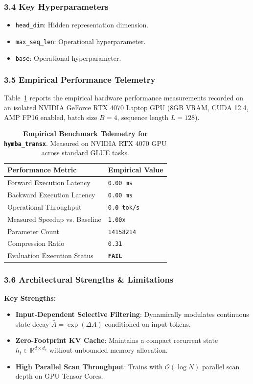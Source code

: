\subsubsection*{3.4 Key Hyperparameters}
\begin{itemize}
    \item \texttt{head\_dim}: Hidden representation dimension.
    \item \texttt{max\_seq\_len}: Operational hyperparameter.
    \item \texttt{base}: Operational hyperparameter.
\end{itemize}

\subsubsection*{3.5 Empirical Performance Telemetry}
Table~\ref{tab:telemetry_hymba\_transx} reports the empirical hardware performance measurements recorded on an isolated NVIDIA GeForce RTX 4070 Laptop GPU (8GB VRAM, CUDA 12.4, AMP FP16 enabled, batch size $B=4$, sequence length $L=128$).

\begin{table}[h]
\centering
\small
\caption{\textbf{Empirical Benchmark Telemetry for \texttt{hymba\_transx}}. Measured on NVIDIA RTX 4070 GPU across standard GLUE tasks.}
\label{tab:telemetry_hymba\_transx}
\begin{tabularx}{\columnwidth}{lX}
\toprule
\textbf{Performance Metric} & \textbf{Empirical Value} \\
\midrule
Forward Execution Latency & \texttt{0.00 ms} \\
Backward Execution Latency & \texttt{0.00 ms} \\
Operational Throughput & \texttt{0.0 tok/s} \\
Measured Speedup vs. Baseline & \texttt{1.00x} \\
Parameter Count & \texttt{14158214} \\
Compression Ratio & \texttt{0.31} \\
Evaluation Execution Status & \textbf{\texttt{FAIL}} \\
\bottomrule
\end{tabularx}
\end{table}

\subsubsection*{3.6 Architectural Strengths \& Limitations}
\textbf{Key Strengths:}
\begin{itemize}
    \item \textbf{Input-Dependent Selective Filtering}: Dynamically modulates continuous state decay $\bar{A} = \exp(\Delta A)$ conditioned on input tokens.
    \item \textbf{Zero-Footprint KV Cache}: Maintains a compact recurrent state $h_t \in \mathbb{R}^{d \times d_s}$ without unbounded memory allocation.
    \item \textbf{High Parallel Scan Throughput}: Trains with $\mathcal{O}(\log N)$ parallel scan depth on GPU Tensor Cores.
\end{itemize}

